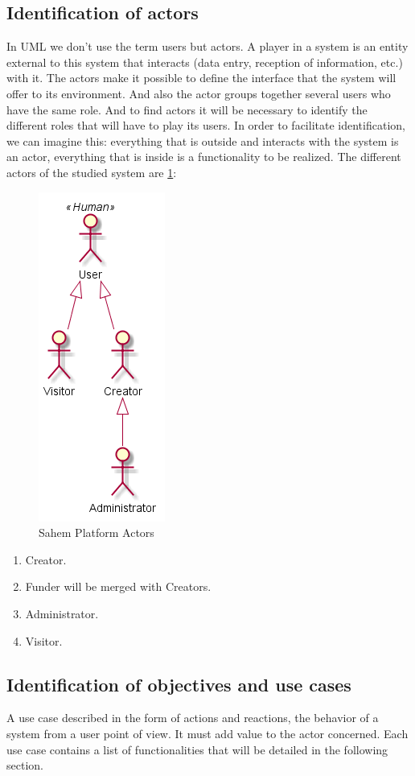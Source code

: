 \subsection{Identification of actors}
In UML we don't use the term users but actors. A player in a system is an entity external to this system that interacts (data entry, reception of information, etc.) with it. The actors make it possible to define the interface that the system will offer to its environment. And also the actor groups together several users who have the same role. And to find actors it will be necessary to identify the different roles that will have to play its users.
In order to facilitate identification, we can imagine this: everything that is outside and interacts with the system is an actor, everything that is inside is a functionality to be realized.
The different actors of the studied system are \ref{fig:sahemactors}:
\begin{figure}[!ht]
      \centering
      \includegraphics[scale=0.60]{assets/Actors.png}
      \caption{Sahem Platform Actors}
      \label{fig:sahemactors}
\end{figure}
\begin{enumerate}
    \item  Creator.
    \item  Funder will be merged with Creators.
    \item  Administrator.
    \item  Visitor.
\end{enumerate}

\subsection{Identification of objectives and use cases}
A use case described in the form of actions and reactions, the behavior of a system from a user point of view. It must add value to the actor concerned. Each use case contains a list of functionalities that will be detailed in the following section.

